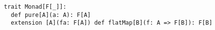 \begin{algorithm}

\begin{verbatim}
trait Monad[F[_]]:
  def pure[A](a: A): F[A]
  extension [A](fa: F[A]) def flatMap[B](f: A => F[B]): F[B]
\end{verbatim}

\caption{Monad type class in Scala 3 %
\label{monad:scala}}
\end{algorithm}